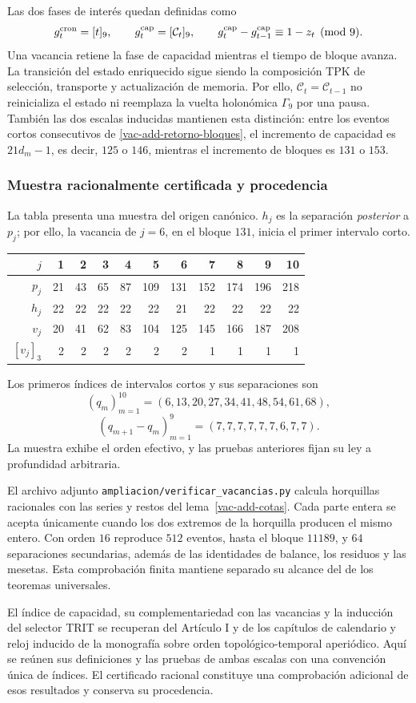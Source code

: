 Las dos fases de interés quedan definidas como
\[
 g_t^{\rm cron}=[t]_9,
 \qquad g_t^{\rm cap}=[\mathcal C_t]_9,
 \qquad
 g_t^{\rm cap}-g_{t-1}^{\rm cap}\equiv1-z_t\pmod9.
\]
Una vacancia retiene la fase de capacidad mientras el tiempo de bloque
avanza. La transición del estado enriquecido sigue siendo la composición
TPK de selección, transporte y actualización de memoria. Por ello,
\(\mathcal C_t=\mathcal C_{t-1}\) no reinicializa el estado ni
reemplaza la vuelta holonómica \(\Gamma_9\) por una pausa. También
las dos escalas inducidas mantienen esta distinción: entre los eventos
cortos consecutivos de \eqref{vac-add-retorno-bloques}, el incremento de
capacidad es \(21d_m-1\), es decir, \(125\) o \(146\), mientras
el incremento de bloques es \(131\) o \(153\).

\subsubsection{Muestra racionalmente certificada y procedencia}
\label{vac-add-muestra}

La tabla presenta una muestra del origen canónico. \(h_j\) es la
separación \emph{posterior} a \(p_j\); por ello, la vacancia de
\(j=6\), en el bloque \(131\), inicia el primer intervalo corto.
\begin{center}
\small
\begin{tabular}{r|rrrrrrrrrr}
\toprule
\(j\)&1&2&3&4&5&6&7&8&9&10\\
\midrule
\(p_j\)&21&43&65&87&109&131&152&174&196&218\\
\(h_j\)&22&22&22&22&22&21&22&22&22&22\\
\(v_j\)&20&41&62&83&104&125&145&166&187&208\\
\([v_j]_3\)&2&2&2&2&2&2&1&1&1&1\\
\bottomrule
\end{tabular}
\end{center}
Los primeros índices de intervalos cortos y sus separaciones son
\[
 (q_m)_{m=1}^{10}=(6,13,20,27,34,41,48,54,61,68),
\]
\[
 (q_{m+1}-q_m)_{m=1}^{9}=(7,7,7,7,7,7,6,7,7).
\]
La muestra exhibe el orden efectivo, y las pruebas anteriores fijan
su ley a profundidad arbitraria.

El archivo adjunto \texttt{ampliacion/verificar\_vacancias.py} calcula
horquillas racionales con las series y restos del
lema~\ref{vac-add-cotas}. Cada parte entera se acepta únicamente cuando
los dos extremos de la horquilla producen el mismo entero. Con orden
\(16\) reproduce \(512\) eventos, hasta el bloque \(11189\), y
\(64\) separaciones secundarias, además de las identidades de balance,
los residuos y las mesetas. Esta comprobación finita mantiene separado
su alcance del de los teoremas universales.

El índice de capacidad, su complementariedad con las vacancias y la
inducción del selector TRIT se recuperan del Artículo I y de los
capítulos de calendario y reloj inducido de la monografía sobre orden
topológico-temporal aperiódico. Aquí se reúnen sus definiciones y las
pruebas de ambas escalas con una convención única de índices. El
certificado racional constituye una comprobación adicional de esos
resultados y conserva su procedencia.
